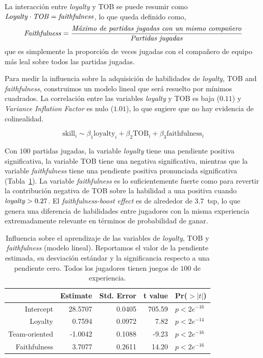 \documentclass[a4paper,11pt]{book}
\theoremstyle{definition}
\begin{document}
La interacci\'on entre \emph{loyalty} y TOB se puede resumir como $ \text{\emph{Loyalty}} \cdot \text{\emph{TOB}} = \text{\emph{faithfulness}}$, lo que queda definido como,
%
\begin{equation}
\text{\emph{Faithfulness}} = \frac{\text{\emph{M\'aximo de partidas jugadas con un mismo compa\~nero}}}{\text{\emph{Partidas jugadas}}}
\end{equation}
%
que es simplemente la proporci\'on de veces jugadas con el compa\~nero de equipo m\'as leal sobre todos las partidas jugadas.


Para medir la influencia sobre la adquisici\'on de habilidades de \emph{loyalty}, TOB and \emph{faithfulness}, construimos un modelo lineal que ser\'a resuelto por m\'inimos cuadrados.
%
La correlaci\'on entre las variables \emph{loyalty} y TOB es baja ($0.11$) y \emph{Variance Inflation Factor} es nulo ($1.01$), lo que sugiere que no hay evidencia de colinealidad.

\begin{equation}
\text{skill}_i \sim \beta_1\text{loyalty}_i + \beta_2\text{TOB}_i + \beta_3\text{faithfulness}_i
\end{equation}

Con $100$ partidas jugadas, la variable \emph{loyalty} tiene una pendiente positiva significativa, la variable TOB tiene una negativa significativa, mientras que la variable \emph{faithfulness} tiene una pendiente positiva pronunciada significativa (Tabla~\ref{model}).
%
La variable \emph{faithfulness} es lo suficientemente fuerte como para revertir la contribuci\'on negativa de TOB sobre la habilidad a una positiva cuando $\text{\emph{loyalty}}>0.27$.
%
El \emph{faithfulness-boost effect} es de alrededor de $3.7$~tsp, lo que genera una diferencia de habilidades entre jugadores con la misma experiencia extremadamente relevante en t\'erminos de probabilidad de ganar.

\begin{table}[ht]
\centering
\begin{tabular}{rrrrl}
  \hline
 & Estimate & Std. Error & t value & Pr($>|t|$) \\
  \hline
Intercept & 28.5707 & 0.0405 & 705.59 & $p< 2e^{-16}$ \\
  Loyalty & 0.7594 & 0.0972 & 7.82 & $p< 2e^{-14}$ \\
  Team-oriented & -1.0042 & 0.1088 & -9.23 & $p< 2e^{-16}$ \\
  Faithfulness & 3.7077 & 0.2611 & 14.20 & $p< 2e^{-16}$ \\
   \hline
\end{tabular}
\caption{
Influencia sobre el aprendizaje de las variables de \emph{loyalty}, TOB y \emph{faithfulness} (modelo lineal). Reportamos el valor de la pendiente estimada, su desviaci\'on est\'andar y la significancia respecto a una pendiente cero. Todos los jugadores tienen juegos de $100$ de experiencia.
}
\label{model}
\end{table}
\end{document}
